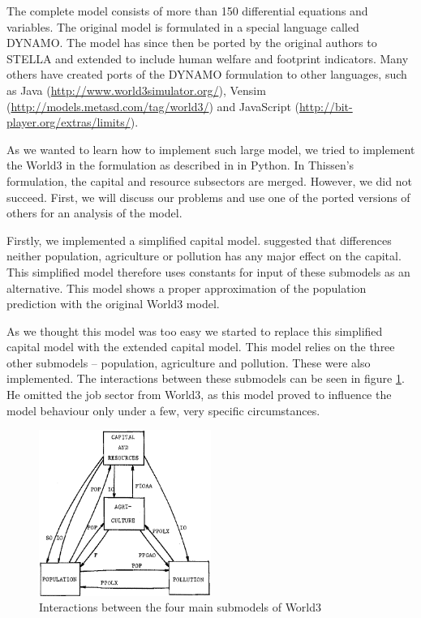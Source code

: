\documentclass[10pt,a4paper]{scrartcl}
\begin{document}
The complete model consists of more than 150 differential equations and variables. The original model is formulated in a special language called DYNAMO. The model has since then be ported by the original authors to STELLA and extended to include human welfare and footprint indicators. Many others have created ports of the DYNAMO formulation to other languages, such as Java (\url{http://www.world3simulator.org/}), Vensim (\url{http://models.metasd.com/tag/world3/}) and JavaScript (\url{http://bit-player.org/extras/limits/}).

As we wanted to learn how to implement such large model, we tried to implement the World3 in the formulation as described in \cite{thissen1978investigations} in Python. In Thissen's formulation, the capital and resource subsectors are merged. However, we did not succeed. First, we will discuss our problems and use one of the ported versions of others for an analysis of the model.

Firstly, we implemented a simplified capital model. \cite{thissen1978investigations} suggested that differences neither population, agriculture or pollution has any major effect on the capital. This simplified model therefore uses constants for input of these submodels as an alternative. This model shows a proper approximation of the population prediction with the original World3 model.

As we thought this model was too easy we started to replace this simplified capital model with the extended capital model. This model relies on the three other submodels – population, agriculture and pollution. These were also implemented. The interactions between these submodels can be seen in figure \ref{interactions}. He omitted the job sector from World3, as this model proved to influence the model behaviour only under a few, very specific circumstances.

\begin{figure}
\centering
\includegraphics[width=0.5\textwidth]{./plaatjes/submodel-interactions.png}
\caption{Interactions between the four main submodels
of World3}
\label{interactions}
\end{figure}
\end{document}

